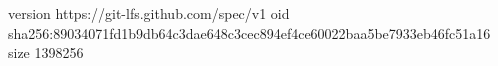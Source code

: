 version https://git-lfs.github.com/spec/v1
oid sha256:89034071fd1b9db64c3dae648c3cec894ef4ce60022baa5be7933eb46fc51a16
size 1398256
